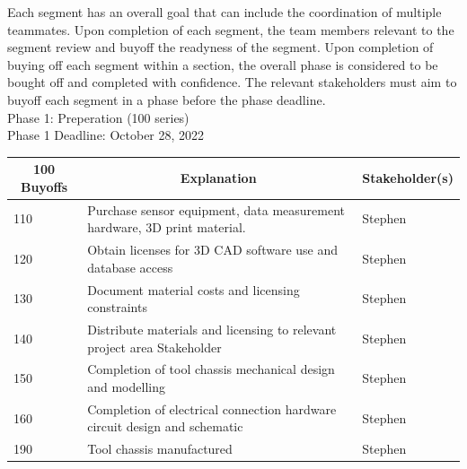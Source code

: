 \documentclass[12pt]{article}
\begin{document}
Each segment has an overall goal that can include the coordination of multiple teammates. Upon completion of each segment, the team members relevant to the segment review and buyoff the readyness of the segment. Upon completion of buying off each segment within a section, the overall phase is considered to be bought off and completed with confidence. The relevant stakeholders must aim to buyoff each segment in a phase before the phase deadline.\\



Phase 1: Preperation (100 series)\\
Phase 1 Deadline: October 28, 2022\\

\begin{table}[H]
  \centering
  \begin{tabular}{|p{2cm}|p{10cm}|p{2cm}|}
  \hline
  \multicolumn{1}{|c|}{\textbf{100 Buyoffs}} & \multicolumn{1}{c|}{\textbf{Explanation}} & \multicolumn{1}{|c|}{\textbf{Stakeholder(s)}}
  \\ \hline
  110
  & Purchase sensor equipment, data measurement hardware, 3D print material.
  & Stephen
  \newline                                
  \\ \hline

  120                              
  & Obtain licenses for 3D CAD software use and database access
  & Stephen
  \newline                                
  \\ \hline

  130                          
  & Document material costs and licensing constraints
  & Stephen
  \newline                                
  \\ \hline

  140                                
  & Distribute materials and licensing to relevant project area Stakeholder
  & Stephen 
  \newline                            
  \\ \hline

  150                                
  & Completion of tool chassis mechanical design and modelling
  & Stephen 
  \newline                            
  \\ \hline

  160                                
  & Completion of electrical connection hardware circuit design and schematic
  & Stephen 
  \newline                            
  \\ \hline

  190                                
  & Tool chassis manufactured
  & Stephen 
  \newline                            
  \\ \hline

  \end{tabular}
\end{table}
\newpage
\end{document}
